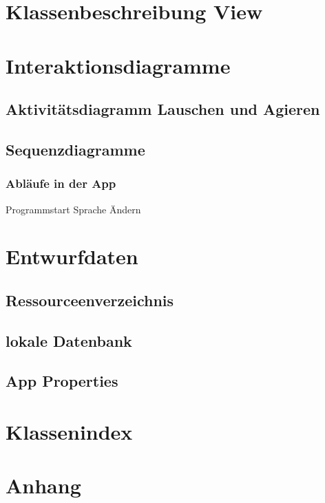 \documentclass[a4paper,12pt]{article}
\begin{document}
\section{Klassenbeschreibung View}
\section{Interaktionsdiagramme}
\subsection{Aktivitätsdiagramm Lauschen und Agieren}
\subsection{Sequenzdiagramme}
\subsubsection{Abläufe in der App}
Programmstart
Sprache Ändern
\section{Entwurfdaten}
\subsection{Ressourceenverzeichnis}
\subsection{lokale Datenbank}
\subsection{App Properties}

\section{Klassenindex}
\section{Anhang}

\clearpage
\printglossaries
{}
\end{document}
